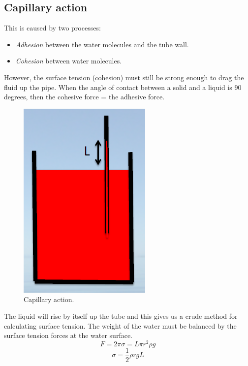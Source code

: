 \documentclass[class=report, crop=false, 12pt,a4paper]{standalone}
\numberwithin{equation}{section}
\begin{document}
\subsection{Capillary action}
This is caused by two processes:
\begin{itemize}[noitemsep]
  \item \emph{Adhesion} between the water molecules and the tube wall.
  \item \emph{Cohesion} between water molecules.
\end{itemize}
However, the surface tension (cohesion) must still be strong enough to drag the fluid up the pipe. When the angle of contact between a solid and a liquid is 90 degrees, then the cohesive force = the adhesive force.
\begin{figure}[h!]
  \centering
  \includegraphics[width = 0.4 \textwidth]{../img/CapillaryAction}
  \caption{Capillary action.}
\end{figure}
The liquid will rise by itself up the tube and this gives us a crude method for calculating surface tension. The weight of the water must be balanced by the surface tension forces at the water surface.
\begin{equation}
  F = 2\pi \sigma = L\pi r^2 \rho g
\end{equation}
\begin{equation}
  \sigma = \frac{1}{2}\rho r g L
\end{equation}
\end{document}
